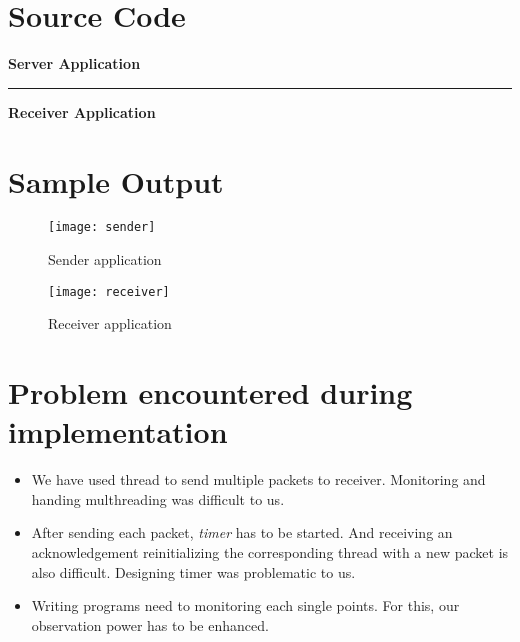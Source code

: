 \documentclass[12pt,a4paper]{report}
\begin{document}
\section*{Source Code}
\lstset{showstringspaces=false}
\textbf{Server Application}





\rule{\linewidth}{0.4pt}

\textbf{Receiver Application}



\section*{Sample Output}
\begin{figure}[!h]
  \begin{minipage}{0.45\textwidth}
  \texttt{[image: sender]}
  \caption{Sender application}
  \end{minipage}
  \begin{minipage}{0.45\textwidth}
  \texttt{[image: receiver]}
  \caption{Receiver application}
  \end{minipage}
\end{figure}
\section*{Problem encountered during implementation}
\begin{itemize}
  \item We have used thread to send multiple packets to receiver. Monitoring and handing multhreading was difficult to us.
  \item After sending each packet, \textit{timer} has to be started. And receiving an acknowledgement reinitializing the corresponding thread with a new packet is also difficult. Designing timer was problematic to us.
  \item Writing programs need to monitoring each single points. For this, our observation power has to be enhanced.
\end{itemize}
\end{document}
